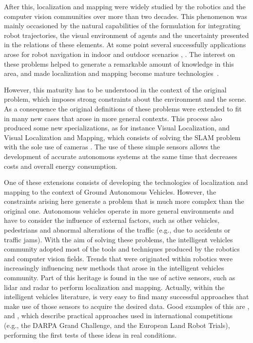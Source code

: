 After this, localization and mapping were widely studied by the robotics and the computer vision communities over more than two decades. This phenomenon was mainly occasioned by the natural capabilities of the formulation for integrating robot trajectories, the visual environment of agents and the uncertainty presented in the relations of these elements. At some point several successfully applications arose for robot navigation in indoor and outdoor scenarios \cite{ConsistencyImprovement}, \cite{OutdoorSLAM}. The interest on these problems helped to generate a remarkable amount of knowledge in this area, and made localization and mapping become mature technologies~\cite{VSLAMDC}. 

However, this maturity has to be understood in the context of the original problem, which imposes strong constraints about the environment and the scene. As a consequence the original definitions of these problems were extended to fit in many new cases that arose in more general contexts. This process also produced some new specializations, as for instance Visual Localization, and Visual Localization and Mapping, which consists of solving the SLAM problem with the sole use of cameras \cite{ParallelVSLAM}. The use of these simple sensors allows the development of accurate autonomous systems at the same time that decreases costs and overall energy consumption. 

One of these extensions consists of developing the technologies of localization and mapping to the context of Ground Autonomous Vehicles. However, the constraints arising here generate a problem that is much more complex than the original one. Autonomous vehicles operate in more general environments and have to consider the influence of external factors, such as other vehicles, pedestrians and abnormal alterations of the traffic (e.g., due to accidents or traffic jams). With the aim of solving these problems, the intelligent vehicles community adopted most of the tools and techniques produced by the robotics and computer vision fields. Trends that were originated within robotics were increasingly influencing new methods that arose in the intelligent vehicles community. Part of this heritage is found in the use of active sensors, such as lidar and radar to perform localization and mapping. Actually, within the intelligent vehicles literature, is very easy to find many successful approaches that make use of those sensors to acquire the desired data. Good examples of this are \cite{Junior}, \cite{RobustVehicleLoc} and \cite{OffRoad}, which describe practical approaches used in international competitions (e.g., the DARPA Grand Challenge, and the European Land Robot Trials), performing the first tests of these ideas in real conditions.

